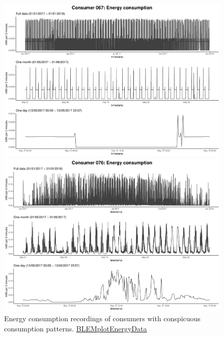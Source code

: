 \begin{figure}
    \begin{minipage}[ht]{\dimexpr.5\textheight-0.15em}
    \includegraphics[width=\textwidth]{thesis/graphs/timeseries/c067_cons.pdf}
    \end{minipage}
    \begin{minipage}[ht]{\dimexpr.5\textheight-0.15em}
    \includegraphics[width=\textwidth]{thesis/graphs/timeseries/c076_cons.pdf}
    \end{minipage}
    
    \caption[Energy consumption of consumers with conspicuous consumption patterns]{Energy consumption recordings of consumers with conspicuous consumption patterns. \quantnet\href{https://github.com/QuantLet/BLEM/tree/master/BLEMplotEnergyData}{BLEMplotEnergyData}}
    \label{Fig:consenergycons_peculiar}
\end{figure}

